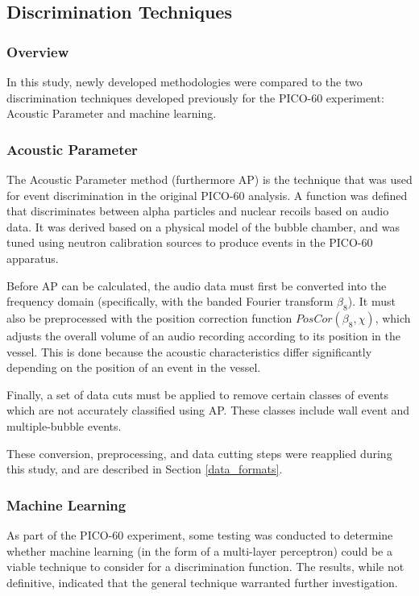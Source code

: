 \documentclass[10pt]{article}
\begin{document}
\subsection{Discrimination Techniques}

\subsubsection{Overview}

In this study, newly developed methodologies were compared to the two discrimination techniques developed previously for the PICO-60 experiment: Acoustic Parameter and machine learning.

\subsubsection{Acoustic Parameter}

The Acoustic Parameter method (furthermore AP) is the technique that was used for event discrimination in the original PICO-60 analysis. A function was defined that discriminates between alpha particles and nuclear recoils based on audio data. It was derived based on a physical model of the bubble chamber, and was tuned using neutron calibration sources to produce events in the PICO-60 apparatus.

Before AP can be calculated, the audio data must first be converted into the frequency domain (specifically, with the banded Fourier transform $\beta_{8}$). It must also be preprocessed with the position correction function $PosCor(\beta_{8}, \chi)$, which adjusts the overall volume of an audio recording according to its position in the vessel. This is done because the acoustic characteristics differ significantly depending on the position of an event in the vessel.

Finally, a set of data cuts must be applied to remove certain classes of events which are not accurately classified using AP. These classes include wall event and multiple-bubble events.

These conversion, preprocessing, and data cutting steps were reapplied during this study, and are described in Section \ref{data_formats}.

\subsubsection{Machine Learning}

As part of the PICO-60 experiment, some testing was conducted to determine whether machine learning (in the form of a multi-layer perceptron) could be a viable technique to consider for a discrimination function. The results, while not definitive, indicated that the general technique warranted further investigation.
\end{document}
